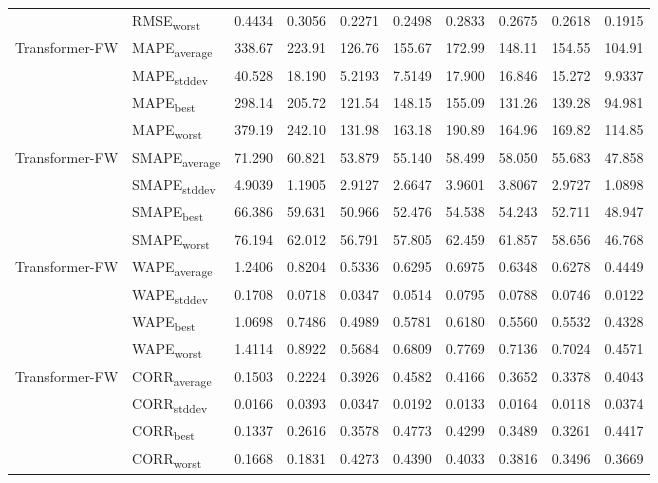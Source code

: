 {\begin{longtable}{l l c c c c c c c c}
 & RMSE\textsubscript{worst} & 0.4434 & 0.3056 & 0.2271 & 0.2498 & 0.2833 & 0.2675 & 0.2618 & 0.1915 \\
\cmidrule(lr){2-10}
\multirow{4}{*}{Transformer-FW} & MAPE\textsubscript{average} & 338.67 & 223.91 & 126.76 & 155.67 & 172.99 & 148.11 & 154.55 & 104.91 \\
 & MAPE\textsubscript{stddev} & 40.528 & 18.190 & 5.2193 & 7.5149 & 17.900 & 16.846 & 15.272 & 9.9337 \\
 & MAPE\textsubscript{best} & 298.14 & 205.72 & 121.54 & 148.15 & 155.09 & 131.26 & 139.28 & 94.981 \\
 & MAPE\textsubscript{worst} & 379.19 & 242.10 & 131.98 & 163.18 & 190.89 & 164.96 & 169.82 & 114.85 \\
\cmidrule(lr){2-10}
\multirow{4}{*}{Transformer-FW} & SMAPE\textsubscript{average} & 71.290 & 60.821 & 53.879 & 55.140 & 58.499 & 58.050 & 55.683 & 47.858 \\
 & SMAPE\textsubscript{stddev} & 4.9039 & 1.1905 & 2.9127 & 2.6647 & 3.9601 & 3.8067 & 2.9727 & 1.0898 \\
 & SMAPE\textsubscript{best} & 66.386 & 59.631 & 50.966 & 52.476 & 54.538 & 54.243 & 52.711 & 48.947 \\
 & SMAPE\textsubscript{worst} & 76.194 & 62.012 & 56.791 & 57.805 & 62.459 & 61.857 & 58.656 & 46.768 \\
\cmidrule(lr){2-10}
\multirow{4}{*}{Transformer-FW} & WAPE\textsubscript{average} & 1.2406 & 0.8204 & 0.5336 & 0.6295 & 0.6975 & 0.6348 & 0.6278 & 0.4449 \\
 & WAPE\textsubscript{stddev} & 0.1708 & 0.0718 & 0.0347 & 0.0514 & 0.0795 & 0.0788 & 0.0746 & 0.0122 \\
 & WAPE\textsubscript{best} & 1.0698 & 0.7486 & 0.4989 & 0.5781 & 0.6180 & 0.5560 & 0.5532 & 0.4328 \\
 & WAPE\textsubscript{worst} & 1.4114 & 0.8922 & 0.5684 & 0.6809 & 0.7769 & 0.7136 & 0.7024 & 0.4571 \\
\cmidrule(lr){2-10}
\multirow{4}{*}{Transformer-FW} & CORR\textsubscript{average} & 0.1503 & 0.2224 & 0.3926 & 0.4582 & 0.4166 & 0.3652 & 0.3378 & 0.4043 \\
 & CORR\textsubscript{stddev} & 0.0166 & 0.0393 & 0.0347 & 0.0192 & 0.0133 & 0.0164 & 0.0118 & 0.0374 \\
 & CORR\textsubscript{best} & 0.1337 & 0.2616 & 0.3578 & 0.4773 & 0.4299 & 0.3489 & 0.3261 & 0.4417 \\
 & CORR\textsubscript{worst} & 0.1668 & 0.1831 & 0.4273 & 0.4390 & 0.4033 & 0.3816 & 0.3496 & 0.3669 \\

\end{longtable}}
